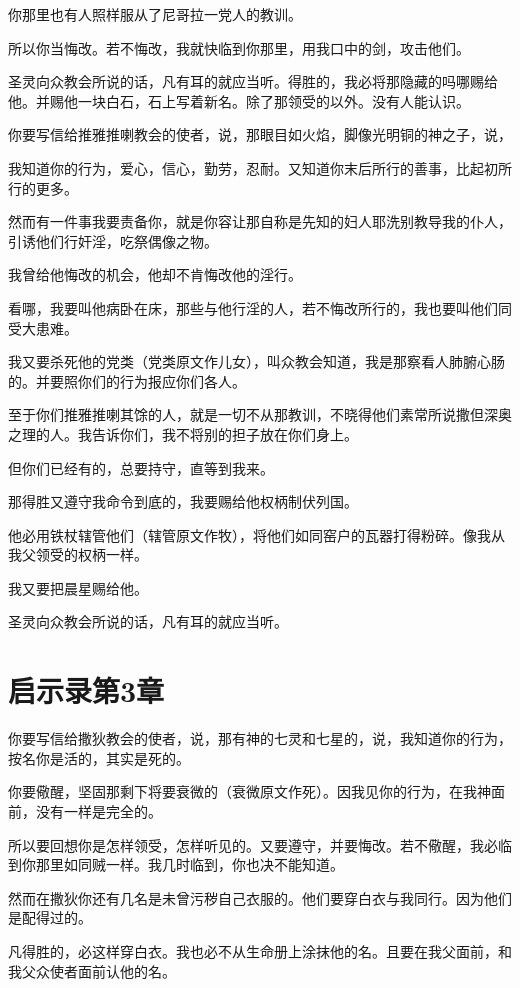 \documentclass[12pt,oneside]{book}
\begin{document}
你那里也有人照样服从了尼哥拉一党人的教训。

所以你当悔改。若不悔改，我就快临到你那里，用我口中的剑，攻击他们。

圣灵向众教会所说的话，凡有耳的就应当听。得胜的，我必将那隐藏的吗哪赐给他。并赐他一块白石，石上写着新名。除了那领受的以外。没有人能认识。

你要写信给推雅推喇教会的使者，说，那眼目如火焰，脚像光明铜的神之子，说，

我知道你的行为，爱心，信心，勤劳，忍耐。又知道你末后所行的善事，比起初所行的更多。

然而有一件事我要责备你，就是你容让那自称是先知的妇人耶洗别教导我的仆人，引诱他们行奸淫，吃祭偶像之物。

我曾给他悔改的机会，他却不肯悔改他的淫行。

看哪，我要叫他病卧在床，那些与他行淫的人，若不悔改所行的，我也要叫他们同受大患难。

我又要杀死他的党类（党类原文作儿女），叫众教会知道，我是那察看人肺腑心肠的。并要照你们的行为报应你们各人。

至于你们推雅推喇其馀的人，就是一切不从那教训，不晓得他们素常所说撒但深奥之理的人。我告诉你们，我不将别的担子放在你们身上。

但你们已经有的，总要持守，直等到我来。

那得胜又遵守我命令到底的，我要赐给他权柄制伏列国。

他必用铁杖辖管他们（辖管原文作牧），将他们如同窑户的瓦器打得粉碎。像我从我父领受的权柄一样。

我又要把晨星赐给他。

圣灵向众教会所说的话，凡有耳的就应当听。

\chapter{启示录第3章}
你要写信给撒狄教会的使者，说，那有神的七灵和七星的，说，我知道你的行为，按名你是活的，其实是死的。

你要儆醒，坚固那剩下将要衰微的（衰微原文作死）。因我见你的行为，在我神面前，没有一样是完全的。

所以要回想你是怎样领受，怎样听见的。又要遵守，并要悔改。若不儆醒，我必临到你那里如同贼一样。我几时临到，你也决不能知道。

然而在撒狄你还有几名是未曾污秽自己衣服的。他们要穿白衣与我同行。因为他们是配得过的。

凡得胜的，必这样穿白衣。我也必不从生命册上涂抹他的名。且要在我父面前，和我父众使者面前认他的名。
\end{document}

